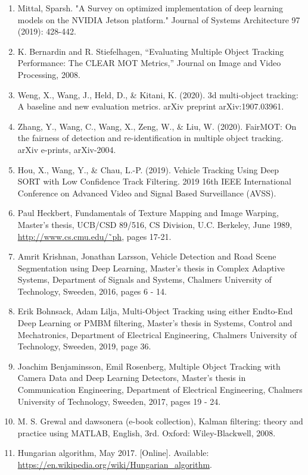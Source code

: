 \begin{enumerate}
    \item Mittal, Sparsh. "A Survey on optimized implementation of deep learning models on the NVIDIA Jetson platform." Journal of Systems Architecture 97 (2019): 428-442.
    \item K. Bernardin and R. Stiefelhagen, “Evaluating Multiple Object Tracking Performance: The CLEAR MOT Metrics,” Journal on Image and Video Processing, 2008.
    \item Weng, X., Wang, J., Held, D., \& Kitani, K. (2020). 3d multi-object tracking: A baseline and new evaluation metrics. arXiv preprint arXiv:1907.03961.
    \item Zhang, Y., Wang, C., Wang, X., Zeng, W., \& Liu, W. (2020). FairMOT: On the fairness of detection and re-identification in multiple object tracking. arXiv e-prints, arXiv-2004.
    \item Hou, X., Wang, Y., \& Chau, L.-P. (2019). Vehicle Tracking Using Deep SORT with Low Confidence Track Filtering. 2019 16th IEEE International Conference on Advanced Video and Signal Based Surveillance (AVSS).
    \item Paul Heckbert, Fundamentals of Texture Mapping and Image Warping, Master’s thesis, UCB/CSD 89/516, CS Division, U.C. Berkeley, June 1989, \url{http://www.cs.cmu.edu/˜ph}, pages 17-21.
    \item Amrit Krishnan, Jonathan Larsson, Vehicle Detection and Road Scene Segmentation using Deep Learning, Master’s thesis in Complex Adaptive Systems, Department of Signals and Systems, Chalmers University of Technology, Sweeden, 2016, pages 6 - 14.
    \item Erik Bohnsack, Adam Lilja, Multi-Object Tracking using either Endto-End Deep Learning or PMBM filtering, Master’s thesis in Systems, Control and Mechatronics, Department of Electrical Engineering, Chalmers University of Technology, Sweeden, 2019, page 36.
    \item Joachim Benjaminsson, Emil Rosenberg, Multiple Object Tracking with Camera Data and Deep Learning Detectors, Master’s thesis in Communication Engineering, Department of Electrical Engineering, Chalmers University of Technology, Sweeden, 2017, pages 19 - 24.
    \item M. S. Grewal and dawsonera (e-book collection), Kalman filtering: theory and practice using MATLAB, English, 3rd. Oxford: Wiley-Blackwell, 2008.
    \item Hungarian algorithm, May 2017. [Online]. Available: \url{https://en.wikipedia.org/wiki/Hungarian_algorithm}.
\end{enumerate}